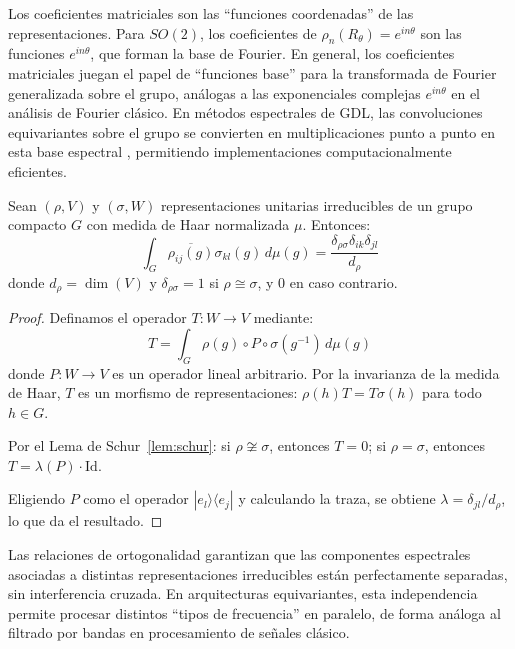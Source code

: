 Los coeficientes matriciales son las ``funciones coordenadas'' de las representaciones. Para $SO(2)$, los coeficientes de $\rho_n(R_\theta) = e^{in\theta}$ son las funciones $e^{in\theta}$, que forman la base de Fourier. En general, los coeficientes matriciales juegan el papel de ``funciones base'' para la transformada de Fourier generalizada sobre el grupo, análogas a las exponenciales complejas $e^{in\theta}$ en el análisis de Fourier clásico. En métodos espectrales de \gls{GDL}, las convoluciones equivariantes sobre el grupo se convierten en multiplicaciones punto a punto en esta base espectral \citep{kondor2018generalizationconvolutionalneural}, permitiendo implementaciones computacionalmente eficientes.

\begin{proposition}\label{prop:ortogonalidad_schur}
Sean $(\rho, V)$ y $(\sigma, W)$ representaciones unitarias irreducibles de un grupo compacto $G$ con medida de Haar normalizada $\mu$. Entonces:
\begin{equation}\label{eq:ortogonalidad_schur}
\int_G \overline{\rho_{ij}(g)} \sigma_{kl}(g) \, d\mu(g) = \frac{\delta_{\rho\sigma} \delta_{ik} \delta_{jl}}{d_\rho}
\end{equation}
donde $d_\rho = \dim(V)$ y $\delta_{\rho\sigma} = 1$ si $\rho \cong \sigma$, y $0$ en caso contrario.
\end{proposition}

\begin{proof}
Definamos el operador $T: W \to V$ mediante:
\[
T = \int_G \rho(g) \circ P \circ \sigma(g^{-1}) \, d\mu(g)
\]
donde $P: W \to V$ es un operador lineal arbitrario. Por la invarianza de la medida de Haar, $T$ es un morfismo de representaciones: $\rho(h) T = T \sigma(h)$ para todo $h \in G$.

Por el Lema de Schur~\ref{lem:schur}: si $\rho \not\cong \sigma$, entonces $T = 0$; si $\rho = \sigma$, entonces $T = \lambda(P) \cdot \mathrm{Id}$.

Eligiendo $P$ como el operador $|e_l\rangle\langle e_j|$ y calculando la traza, se obtiene $\lambda = \delta_{jl}/d_\rho$, lo que da el resultado.
\end{proof}

Las relaciones de ortogonalidad garantizan que las componentes espectrales asociadas a distintas representaciones irreducibles están perfectamente separadas, sin interferencia cruzada. En arquitecturas equivariantes, esta independencia permite procesar distintos ``tipos de frecuencia'' en paralelo, de forma análoga al filtrado por bandas en procesamiento de señales clásico.

